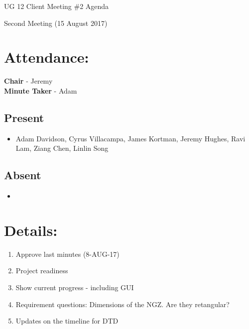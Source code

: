 \documentclass{article}
\begin{document}
\begin{adjustwidth}{2.5em}{0pt}
\begin{center}
\Large{UG 12 Client Meeting \#2 Agenda}\\
\end{center}
\end{adjustwidth}

Second Meeting (15 August 2017)
\section{Attendance:}
\textbf{Chair} - Jeremy\\
\textbf{Minute Taker} - Adam\\
\subsection*{Present}
\begin{itemize}
\item Adam Davidson, Cyrus Villacampa, James Kortman, Jeremy Hughes, Ravi Lam, Ziang Chen, Linlin Song
\end{itemize}
\subsection*{Absent}
\begin{itemize}
\item  
\end {itemize}

\section{Details:}
\begin{enumerate}
\item Approve last minutes (8-AUG-17)
\item Project readiness
\item Show current progress - including GUI
\item Requirement questions: Dimensions of the NGZ. Are they retangular?
\item Updates on the timeline for DTD
\end{enumerate}
\end{document}
